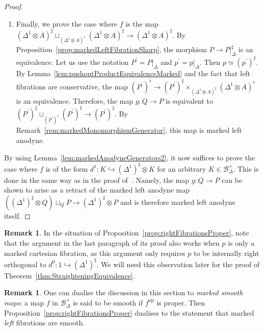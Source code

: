 \documentclass[reqno]{amsart}
\numberwithin{equation}{subsection}
\theoremstyle{plain}
\theoremstyle{definition}
\newtheorem{remark}[equation]{Remark}
\let\scr=\mathcal
\let\into=\hookrightarrow
\def\BB{\scr B}
\newcommand{\op}{\mathrm{op}}
\newcommand{\mSimp}[1]{#1_{\Delta}^+}
\begin{document}
\begin{proof}
\begin{enumerate}
	\item Finally, we prove the case where $f$ is the map $(\Delta^1\otimes A)^\sharp\sqcup_{(\Delta^1\otimes A)^\flat}(\Delta^1\otimes A)^\sharp\to(\Delta^1\otimes A)^\sharp$. By Proposition~\ref{prop:markedLeftFibrationSharp}, the morphism $P\to P\vert_{\Delta}^\sharp$ is an equivalence. Let us use the notation $P^\prime=P\vert_{\Delta}$ and $p^\prime=p\vert_{\Delta}$. Then $p\simeq(p^\prime)^\sharp$. By Lemma~\ref{lem:pushoutProductEquivalenceMarked} and the fact that left fibrations are conservative, the map $(P^\prime)^\flat\to (P^\prime)^\sharp\times_{(\Delta^1\otimes A)^\sharp} (\Delta^1\otimes A)^\flat$ is an equivalence. Therefore, the map $g\colon Q\to P$ is equivalent to $(P^\prime)^\sharp\sqcup_{(P^\prime)^\flat}(P^\prime)^\sharp\to (P^\prime)^\sharp$. By Remark~\ref{rem:markedMonomorphismGenerator}, this map is marked left anodyne.
	\end{enumerate}
	By using Lemma~\ref{lem:markedAnodyneGenerators2}, it now suffices to prove the case where $f$ is of the form $d^1\colon K\into(\Delta^1)^\sharp\otimes K$ for an arbitrary $K\in \mSimp\BB$. This is done in the same way as in the proof of~\cite[Proposition~4.4.7]{Martini2021}. Namely, the map $g\colon Q\to P$ can be shown to arise as a retract of the marked left anodyne map $((\Delta^1)^\sharp\otimes Q)\sqcup_{Q} P\to (\Delta^1)^\sharp\otimes P$ and is therefore marked left anodyne itself.
\end{proof}

\begin{remark}
	\label{rem:cartesianPartiallyProper}
	In the situation of Proposition~\ref{prop:rightFibrationsProper}, note that the argument in the last paragraph of its proof also works when $p$ is only a marked cartesian fibration, as this argument only requires $p$ to be internally right orthogonal to $d^0\colon 1\into(\Delta^1)^\sharp$. We will need this observation later for the proof of Theorem~\ref{thm:StraighteningEquivalence}.
\end{remark}

\begin{remark}
	\label{rem:markedSmoothMaps}
	One can dualise the discussion in this section to \emph{marked smooth maps}: a map $f$ in $\mSimp\BB$ is said to be smooth if $f^\op$ is proper. Then Proposition~\ref{prop:rightFibrationsProper} dualises to the statement that marked \emph{left} fibrations are smooth.
\end{remark}
\end{document}
